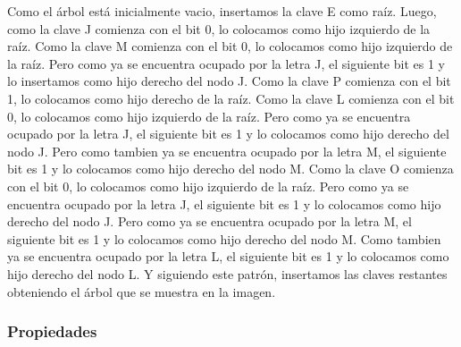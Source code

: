 \documentclass[10pt,a4paper]{article}
\begin{document}
Como el árbol está inicialmente vacio, insertamos la clave E como raíz.
\newline
\newline
Luego, como la clave J comienza con el bit 0, lo colocamos como hijo izquierdo de la raíz.
\newline
\newline
Como la clave M comienza con el bit 0, lo colocamos como hijo izquierdo de la raíz. Pero como ya se encuentra ocupado por la letra J, el siguiente bit es 1 y lo insertamos como hijo derecho del nodo J.
\newline
\newline
Como la clave P comienza con el bit 1, lo colocamos como hijo derecho de la raíz. 
\newline
\newline
Como la clave L comienza con el bit 0, lo colocamos como hijo izquierdo de la raíz. Pero como ya se encuentra ocupado por la letra J, el siguiente bit es 1 y lo colocamos como hijo derecho del nodo J. Pero como tambien ya se encuentra ocupado por la letra M, el siguiente bit es 1 y lo colocamos como hijo derecho del nodo M.
\newline
\newline
Como la clave O comienza con el bit 0, lo colocamos como hijo izquierdo de la raíz. Pero como ya se encuentra ocupado por la letra J, el siguiente bit es 1 y lo colocamos como hijo derecho del nodo J. Pero como ya se encuentra ocupado por la letra M, el siguiente bit es 1 y lo colocamos como hijo derecho del nodo M. Como tambien ya se encuentra ocupado por la letra L, el siguiente bit es 1 y lo colocamos como hijo derecho del nodo L.
\newline
\newline
Y siguiendo este patrón, insertamos las claves restantes obteniendo el árbol que se muestra en la imagen.

\subsubsection{Propiedades}
\end{document}
